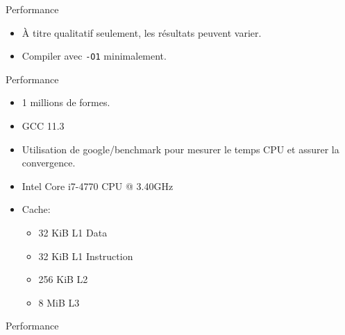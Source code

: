\documentclass[french]{beamer}
\begin{document}
\begin{frame}[fragile]{Performance}
    \begin{itemize}
        \item À titre qualitatif seulement, les résultats peuvent varier.
        \item Compiler avec \lstinline{-O1} minimalement.
    \end{itemize}
\end{frame}

\begin{frame}[fragile]{Performance}
    \begin{itemize}
        \item 1 millions de formes.
        \item GCC 11.3
        \item Utilisation de google/benchmark pour mesurer le temps CPU et assurer la convergence.
        \item Intel Core i7-4770 CPU @ 3.40GHz
        \item Cache:
        \begin{itemize}
            \item 32 KiB L1 Data
            \item 32 KiB L1 Instruction
            \item 256 KiB L2
            \item 8 MiB L3
        \end{itemize}
    \end{itemize}
\end{frame}

\begin{frame}[fragile]{Performance}
\end{frame}
\end{document}
